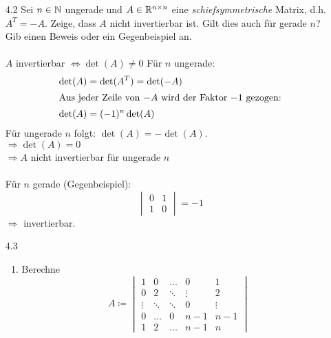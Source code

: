 \documentclass{HM}
\begin{document}
	\begin{enumerate}
	\item[4.2] Sei $n\in\mathbb{N}$ ungerade und $A\in\mathbb{R}^{n\times n}$ eine \textit{schiefsymmetrische} Matrix, d.h. $A^T=-A$. Zeige, dass $A$ nicht invertierbar ist. Gilt dies auch für gerade $n$? Gib einen Beweis oder ein Gegenbeispiel an.\\\\
		$A$ invertierbar $\Leftrightarrow \det(A)\not=0$
		Für $n$ ungerade:\\
		\begin{align*}
			\det(A)&=\det(A^T)=\det(-A)\\
			\intertext{Aus jeder Zeile von $-A$ wird der Faktor $-1$ gezogen:}
			\det(A)&=(-1)^n\det(A)
		\end{align*}
		Für ungerade $n$ folgt: $\det(A)=-\det(A)$.\\
		$\Rightarrow \det(A)=0$\\
		$\Rightarrow A$ nicht invertierbar für ungerade $n$\\\\
		Für $n$ gerade (Gegenbeispiel):
		$$\begin{vmatrix}
			0&1\\
			1&0
		\end{vmatrix} = -1$$
		$\Rightarrow$ invertierbar.
	
	\item[4.3]
		\begin{enumerate}
			\item Berechne\\
			$$A\coloneqq\begin{vmatrix}
				1&0&\hdots&0&1\\
				0&2&\ddots&\vdots&2\\
				\vdots&\ddots&\ddots&0&\vdots\\
				0&\hdots&0&n-1&n-1\\
				1&2&\hdots&n-1&n
			\end{vmatrix}$$
			

\end{enumerate}
\end{enumerate}
\end{document}
